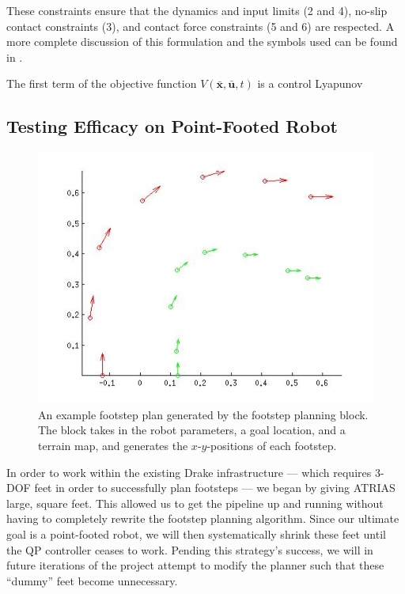 \documentclass[letterpaper, 10 pt, conference]{ieeeconf}  %
\begin{document}
These constraints ensure that the dynamics and input limits (2 and 4), no-slip contact constraints (3), and contact force constraints (5 and 6) are respected. A more complete discussion of this formulation and the symbols used can be found in \cite{kuindersma13}.

The first term of the objective function $V(\bar{\mathbf{x}},\bar{\mathbf{u}},t)$ is a control Lyapunov 

\subsection{Testing Efficacy on Point-Footed Robot}

   \begin{figure}[thpb]
      \centering
      \includegraphics[scale=0.5]{figures/footstep_plan.jpg}
      \caption{An example footstep plan generated by the footstep planning block. The block takes in the robot parameters, a goal location, and a terrain map, and generates the $x$-$y$-positions of each footstep.}
      \label{footstep}
   \end{figure}

In order to work within the existing Drake infrastructure --- which requires 3-DOF feet in order to successfully plan footsteps --- we began by giving ATRIAS large, square feet. This allowed us to get the pipeline up and running without having to completely rewrite the footstep planning algorithm. Since our ultimate goal is a point-footed robot, we will then systematically shrink these feet until the QP controller ceases to work. Pending this strategy’s success, we will in future iterations of the project attempt to modify the planner such that these “dummy” feet become unnecessary.
\end{document}
